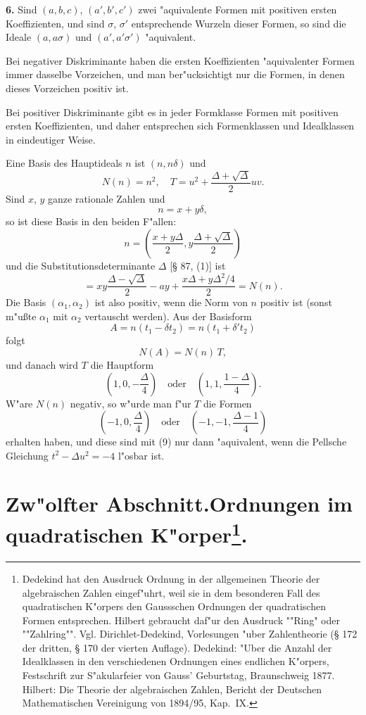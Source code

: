 \documentclass[12pt,a4paper]{article}
\theoremstyle{plain}
\begin{document}
\textbf{6.} Sind $(a, b, c)$, $(a', b', c')$ zwei "aquivalente Formen mit positiven ersten Koeffizienten, und sind $\sigma$, $\sigma'$ entsprechende Wurzeln dieser Formen, so sind die Ideale $(a, a\sigma)$ und $(a', a'\sigma')$ "aquivalent.

Bei negativer Diskriminante haben die ersten Koeffizienten "aquivalenter Formen immer dasselbe Vorzeichen, und man ber"ucksichtigt nur die Formen, in denen dieses Vorzeichen positiv ist.

Bei positiver Diskriminante gibt es in jeder Formklasse Formen mit positiven ersten Koeffizienten, und daher entsprechen sich Formenklassen und Idealklassen in eindeutiger Weise.

Eine Basis des Hauptideals $n$ ist $(n, n\delta)$ und
\[
N(n) = n^2,\quad T = u^2 + \frac{\Delta + \sqrt{\Delta}}{2}uv.
\]
Sind $x$, $y$ ganze rationale Zahlen und
\[
n = x + y\delta,
\]
so ist diese Basis in den beiden F"allen:
\[
n = \left(\frac{x + y\Delta}{2}, y\frac{\Delta + \sqrt{\Delta}}{2}\right)
\]
und die Substitutionsdeterminante $\Delta$ [\S{} 87, (1)] ist
\[
= xy\frac{\Delta - \sqrt{\Delta}}{2} - ay + \frac{x\Delta + y\Delta^2/4}{2} = N(n).
\]
Die Basis $(\alpha_1, \alpha_2)$ ist also positiv, wenn die Norm von $n$ positiv ist (sonst m"u\ss te $\alpha_1$ mit $\alpha_2$ vertauscht werden). Aus der Basisform
\[
A = n(t_1 - \delta t_2) = n(t_1 + \delta' t_2)
\]
folgt
\[
N(A) = N(n)\,T,
\]
und danach wird $T$ die Hauptform
\begin{equation}
\left(1, 0, -\frac{\Delta}{4}\right)\quad \text{oder}\quad \left(1, 1, \frac{1-\Delta}{4}\right).
\tag{9}
\end{equation}
W"are $N(n)$ negativ, so w"urde man f"ur $T$ die Formen
\[
\left(-1, 0, \frac{\Delta}{4}\right)\quad \text{oder}\quad \left(-1, -1, \frac{\Delta-1}{4}\right)
\]
erhalten haben, und diese sind mit (9) nur dann "aquivalent, wenn die Pellsche Gleichung $t^2 - \Delta u^2 = -4$ l"osbar ist.

\newpage
\section*{Zw"olfter Abschnitt.\quad Ordnungen im quadratischen K"orper\protect\footnote{Dedekind hat den Ausdruck Ordnung in der allgemeinen Theorie der algebraischen Zahlen eingef"uhrt, weil sie in dem besonderen Fall des quadratischen K"orpers den Gaussschen Ordnungen der quadratischen Formen entsprechen. Hilbert gebraucht daf"ur den Ausdruck ""Ring" oder ""Zahlring"". Vgl. Dirichlet-Dedekind, Vorlesungen "uber Zahlentheorie (\S{} 172 der dritten, \S{} 170 der vierten Auflage). Dedekind: "Uber die Anzahl der Idealklassen in den verschiedenen Ordnungen eines endlichen K"orpers, Festschrift zur S"akularfeier von Gauss' Geburtstag, Braunschweig 1877. Hilbert: Die Theorie der algebraischen Zahlen, Bericht der Deutschen Mathematischen Vereinigung von 1894/95, Kap.~IX.}.}
\end{document}
